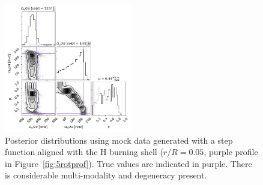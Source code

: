 \begin{figure}
\centering
    \includegraphics[width=0.5\textwidth]{Figures/subgiant_chapter_figures/10.05_corner.png}
    \caption{
    Posterior distributions using mock data generated with a step function aligned with the H burning shell ($r/R = 0.05$, purple profile in Figure~\ref{fig:5rotprof}). True values are indicated in purple. There is considerable multi-modality and degeneracy present.}
    \label{fig:mock_posterior_005_uniform}
\end{figure}


